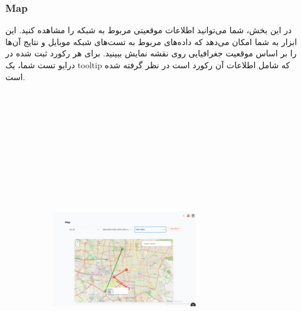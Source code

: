 \documentclass{report}
\begin{document}
\subsubsection{Map}
در این بخش، شما می‌توانید اطلاعات موقعیتی مربوط به شبکه را مشاهده کنید. این ابزار به شما امکان می‌دهد که داده‌های مربوط به تست‌های شبکه موبایل و نتایج آن‌ها را بر اساس موقعیت جغرافیایی روی نقشه نمایش ببینید. برای هر رکورد ثبت شده در درایو تست شما، یک tooltip که شامل اطلاعات آن رکورد است در نظر گرفته شده است.
\begin{figure}[h]
	\centering
	\begin{subfigure}[b]{0.4\textwidth}\centering
		\includegraphics[width=0.7\textwidth,height=15cm,keepaspectratio]{Pic/map}
		\label{fig:map}
	\end{subfigure}
	\begin{subfigure}[b]{0.4\textwidth}\centering

\end{subfigure}
\end{figure}
\end{document}
